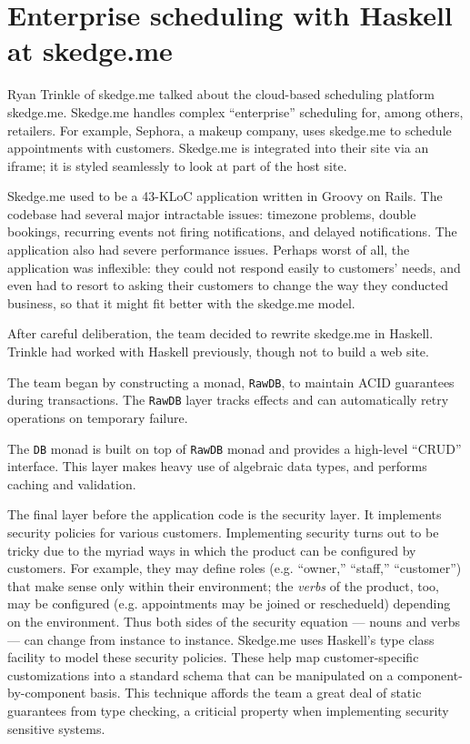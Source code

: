 \documentclass{jfp1}
\begin{document}
\section{Enterprise scheduling with Haskell at skedge.me}


Ryan Trinkle of skedge.me talked about the cloud-based scheduling
platform skedge.me. Skedge.me handles complex ``enterprise''
scheduling for, among others, retailers. For example, Sephora, a
makeup company, uses skedge.me to schedule appointments with
customers. Skedge.me is integrated into their site via an iframe; it
is styled seamlessly to look at part of the host site.

Skedge.me used to be a 43-KLoC application written in Groovy on Rails.
The codebase had several major intractable issues: timezone problems,
double bookings, recurring events not firing notifications, and
delayed notifications. The application also had severe performance
issues. Perhaps worst of all, the application was inflexible: they
could not respond easily to customers' needs, and even had to resort to
asking their customers to change the way they conducted business, so
that it might fit better with the skedge.me model.

After careful deliberation, the team decided to rewrite skedge.me in 
Haskell. Trinkle had worked with Haskell previously, though not
to build a web site.

The team began by constructing a monad, \texttt{RawDB}, to maintain
ACID guarantees during transactions. The \texttt{RawDB} layer tracks
effects and can automatically retry operations on temporary failure.

The \texttt{DB} monad is built on top of \texttt{RawDB} monad and 
provides a high-level ``CRUD'' interface. This layer makes heavy 
use of algebraic data types, and performs caching and validation.

The final layer before the application code is the security layer. It
implements security policies for various customers. Implementing
security turns out to be tricky due to the myriad ways in which the
product can be configured by customers. For example, they may define
roles (e.g. ``owner,'' ``staff,'' ``customer'') that make sense only
within their environment; the \textit{verbs} of the product, too, may
be configured (e.g. appointments may be joined or reschedueld)
depending on the environment. Thus both sides of the security equation
--- nouns and verbs --- can change from instance to instance.
Skedge.me uses Haskell's type class facility to model these security
policies. These help map customer-specific customizations into a
standard schema that can be manipulated on a component-by-component
basis. This technique affords the team a great deal of static
guarantees from type checking, a criticial property when implementing
security sensitive systems.
\end{document}
